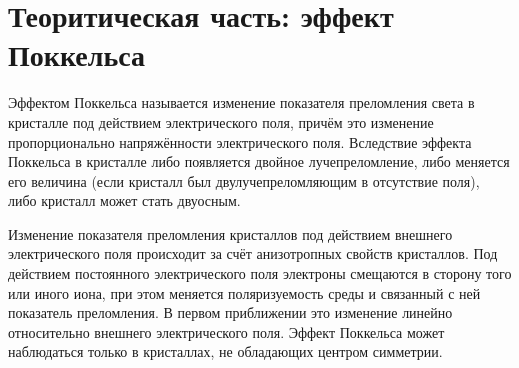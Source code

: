 \documentclass[12pt]{article}
\begin{document}
\section*{Теоритическая часть: эффект Поккельса}
\par
	Эффектом Поккельса называется изменение показателя преломления света в кристалле под действием электрического поля, причём это изменение пропорционально напряжённости 
электрического поля. Вследствие эффекта Поккельса в кристалле либо появляется двойное лучепреломление, либо меняется его величина (если кристалл был двулучепреломляющим в отсутствие поля), либо кристалл может стать двуосным.
\par
	Изменение показателя преломления кристаллов под действием внешнего электрического поля происходит за счёт анизотропных свойств кристаллов. Под действием постоянного электрического поля электроны смещаются в сторону того или иного иона, при этом меняется поляризуемость среды и связанный с ней показатель преломления. В первом приближении это изменение линейно относительно внешнего электрического поля. Эффект Поккельса может наблюдаться только в кристаллах, не обладающих центром симметрии.
\end{document}
